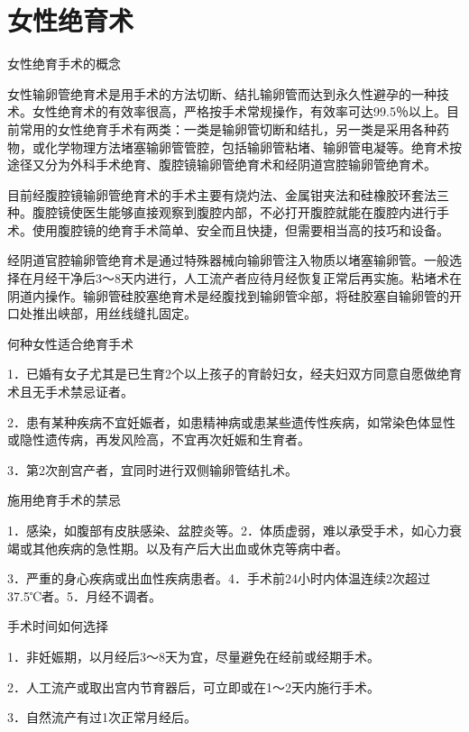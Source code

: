 \documentclass[12pt,UTF8,openany]{ctexbook}
\begin{document}
\chapter{女性绝育术}


女性绝育手术的概念


女性输卵管绝育术是用手术的方法切断、结扎输卵管而达到永久性避孕的一种技术。女性绝育术的有效率很高，严格按手术常规操作，有效率可达99.5％以上。目前常用的女性绝育手术有两类：一类是输卵管切断和结扎，另一类是采用各种药物，或化学物理方法堵塞输卵管管腔，包括输卵管粘堵、输卵管电凝等。绝育术按途径又分为外科手术绝育、腹腔镜输卵管绝育术和经阴道宫腔输卵管绝育术。

目前经腹腔镜输卵管绝育术的手术主要有烧灼法、金属钳夹法和硅橡胶环套法三种。腹腔镜使医生能够直接观察到腹腔内部，不必打开腹腔就能在腹腔内进行手术。使用腹腔镜的绝育手术简单、安全而且快捷，但需要相当高的技巧和设备。

经阴道官腔输卵管绝育术是通过特殊器械向输卵管注入物质以堵塞输卵管。一般选择在月经干净后3～8天内进行，人工流产者应待月经恢复正常后再实施。粘堵术在阴道内操作。输卵管硅胶塞绝育术是经腹找到输卵管伞部，将硅胶塞自输卵管的开口处推出峡部，用丝线缝扎固定。





何种女性适合绝育手术


1．已婚有女子尤其是已生育2个以上孩子的育龄妇女，经夫妇双方同意自愿做绝育术且无手术禁忌证者。

2．患有某种疾病不宜妊娠者，如患精神病或患某些遗传性疾病，如常染色体显性或隐性遗传病，再发风险高，不宜再次妊娠和生育者。

3．第2次剖宫产者，宜同时进行双侧输卵管结扎术。





施用绝育手术的禁忌


1．感染，如腹部有皮肤感染、盆腔炎等。2．体质虚弱，难以承受手术，如心力衰竭或其他疾病的急性期。以及有产后大出血或休克等病中者。

3．严重的身心疾病或出血性疾病患者。4．手术前24小时内体温连续2次超过37.5℃者。5．月经不调者。





手术时间如何选择


1．非妊娠期，以月经后3～8天为宜，尽量避免在经前或经期手术。

2．人工流产或取出宫内节育器后，可立即或在1～2天内施行手术。

3．自然流产有过1次正常月经后。
\end{document}

